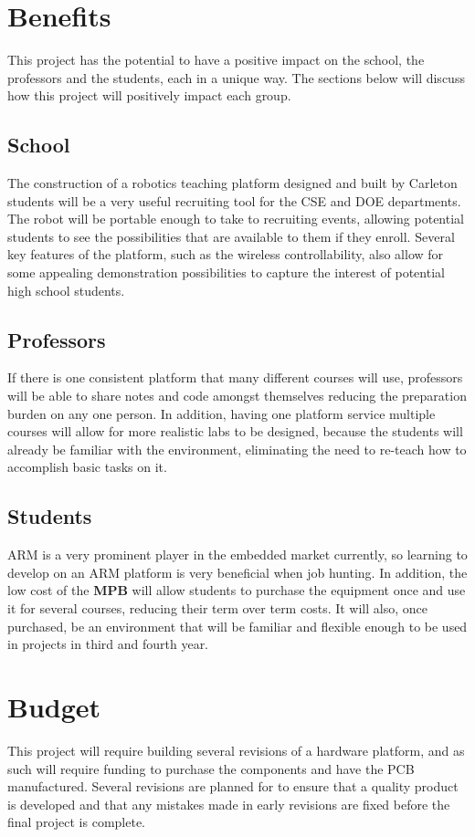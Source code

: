 \documentclass[letterpaper]{article}
\begin{document}
\section{Benefits}
This project has the potential to have a positive impact on the school, the professors and the students, each in a unique way. The sections below will discuss how this project will positively impact each group.

\subsection{School}
The construction of a robotics teaching platform designed and built by Carleton students will be a very useful recruiting tool for the CSE and DOE departments. The robot will be portable enough to take to recruiting events, allowing potential students to see the possibilities that are available to them if they enroll. Several key features of the platform, such as the wireless controllability, also allow for some appealing demonstration possibilities to capture the interest of potential high school students.

\subsection{Professors}
If there is one consistent platform that many different courses will use, professors will be able to share notes and code amongst themselves reducing the preparation burden on any one person. In addition, having one platform service multiple courses will allow for more realistic labs to be designed, because the students will already be familiar with the environment, eliminating the need to re-teach how to accomplish basic tasks on it. 
\subsection{Students}
ARM is a very prominent player in the embedded market currently, so learning to develop on an ARM platform is very beneficial when job hunting. In addition, the low cost of the \textbf{MPB} will allow students to purchase the equipment once and use it for several courses, reducing their term over term costs. It will also, once purchased, be an environment that will be familiar and flexible enough to be used in projects in third and fourth year.
\section{Budget}
This project will require building several revisions of a hardware platform, and as such will require funding to purchase the components and have the PCB manufactured. Several revisions are planned for to ensure that a quality product is developed and that any mistakes made in early revisions are fixed before the final project is complete.
\end{document}

